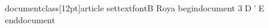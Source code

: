 \ d o c u m e n t c l a s s [ 1 2 p t ] { a r t i c l e } 
 \ s e t t e x t f o n t { B   R o y a } 
 \ b e g i n { d o c u m e n t } 
 3D'E
 \ e n d { d o c u m e n t } 